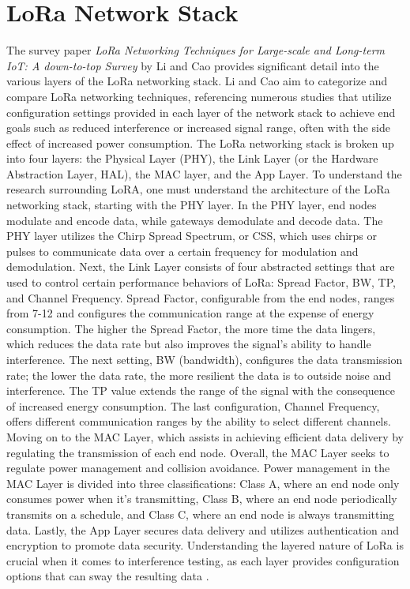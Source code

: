 \documentclass[sigsmall]{acmart}
\begin{document}
\section*{LoRa Network Stack}
The survey paper \textit{LoRa Networking Techniques for Large-scale and Long-term IoT: A down-to-top Survey} by Li and Cao provides significant detail into the various layers of the LoRa networking stack. Li and Cao aim to categorize and compare LoRa networking techniques, referencing numerous studies that utilize configuration settings provided in each layer of the network stack to achieve end goals such as reduced interference or increased signal range, often with the side effect of increased power consumption. The LoRa networking stack is broken up into four layers: the Physical Layer (PHY), the Link Layer (or the Hardware Abstraction Layer, HAL), the MAC layer, and the App Layer.  To understand the research surrounding LoRA, one must understand the architecture of the LoRa networking stack, starting with the PHY layer.  In the PHY layer, end nodes modulate and encode data, while gateways demodulate and decode data. The PHY layer utilizes the Chirp Spread Spectrum, or CSS, which uses chirps or pulses to communicate data over a certain frequency for modulation and demodulation. Next, the Link Layer consists of four abstracted settings that are used to control certain performance behaviors of LoRa: Spread Factor, BW, TP, and Channel Frequency. Spread Factor, configurable from the end nodes, ranges from 7-12 and configures the communication range at the expense of energy consumption. The higher the Spread Factor, the more time the data lingers, which reduces the data rate but also improves the signal's ability to handle interference. The next setting, BW (bandwidth), configures the data transmission rate; the lower the data rate, the more resilient the data is to outside noise and interference. The TP value extends the range of the signal with the consequence of increased energy consumption. The last configuration, Channel Frequency, offers different communication ranges by the ability to select different channels. Moving on to the MAC Layer, which assists in achieving efficient data delivery by regulating the transmission of each end node. Overall, the MAC Layer seeks to regulate power management and collision avoidance. Power management in the MAC Layer is divided into three classifications: Class A, where an end node only consumes power when it’s transmitting, Class B, where an end node periodically transmits on a schedule, and Class C, where an end node is always transmitting data. Lastly, the App Layer secures data delivery and utilizes authentication and encryption to promote data security. Understanding the layered nature of LoRa is crucial when it comes to interference testing, as each layer provides configuration options that can sway the resulting data \cite{li2022lora}.
\end{document}
